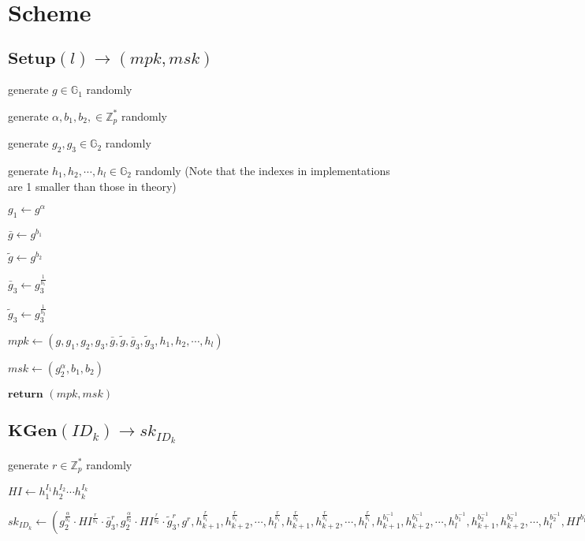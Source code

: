\documentclass[a4paper]{article}
\begin{document}
\section{Scheme}

\subsection{$\textbf{Setup}(l) \rightarrow (\textit{mpk}, \textit{msk})$}

generate $g \in \mathbb{G}_1$ randomly

generate $\alpha, b_1, b_2, \in \mathbb{Z}_p^*$ randomly

generate $g_2, g_3 \in \mathbb{G}_2$ randomly

generate $h_1, h_2, \cdots, h_l \in \mathbb{G}_2$ randomly (Note that the indexes in implementations are 1 smaller than those in theory)

$g_1 \gets g^\alpha$

$\bar{g} \gets g^{b_1}$

$\tilde{g} \gets g^{b_2}$

$\bar{g}_3 \gets g_3^{\frac{1}{b_1}}$

$\tilde{g}_3 \gets g_3^{\frac{1}{b_2}}$

$\textit{mpk} \gets (g, g_1, g_2, g_3, \bar{g}, \tilde{g}, \bar{g}_3, \tilde{g}_3, h_1, h_2, \cdots, h_l)$

$\textit{msk} \gets (g_2^\alpha, b_1, b_2)$

$\textbf{return }(\textit{mpk}, \textit{msk})$

\subsection{$\textbf{KGen}(\textit{ID}_k) \rightarrow \textit{sk}_{\textit{ID}_k}$}

generate $r \in \mathbb{Z}_p^*$ randomly

$\textit{HI} \gets h_1^{I_1}h_2^{I_2}\cdots h_k^{I_k}$

$\textit{sk}_{\textit{ID}_k} \gets (
g_2^{\frac{\alpha}{b_1}} \cdot \textit{HI}^{\frac{r}{b_1}} \cdot \bar{g}_3^r,
g_2^{\frac{\alpha}{b_2}} \cdot \textit{HI}^{\frac{r}{b_2}} \cdot \tilde{g}_3^r,
g^r,
h_{k + 1}^{\frac{r}{b_1}}, h_{k + 2}^{\frac{r}{b_1}}, \cdots, h_l^{\frac{r}{b_1}},
h_{k + 1}^{\frac{r}{b_2}}, h_{k + 2}^{\frac{r}{b_1}}, \cdots, h_l^{\frac{r}{b_1}},
h_{k + 1}^{b_1^{-1}}, h_{k + 2}^{b_1^{-1}}, \cdots, h_l^{b_1^{-1}},
h_{k + 1}^{b_2^{-1}}, h_{k + 2}^{b_2^{-1}}, \cdots, h_l^{b_2^{-1}},
\textit{HI}^{b_1^{-1}}, \textit{HI}^{b_2^{-1}}
)$
\end{document}
